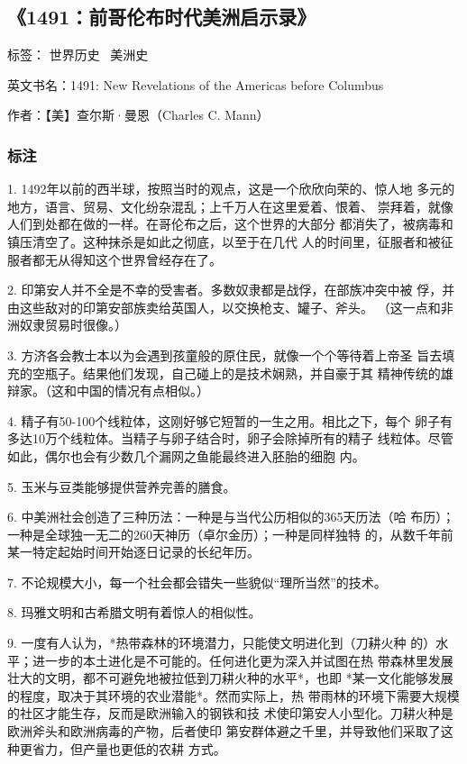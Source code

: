 \subsection{《1491：前哥伦布时代美洲启示录》}

标签： 世界历史 \ 美洲史

英文书名：1491: New Revelations of the Americas before Columbus

作者：【美】查尔斯·曼恩（Charles C. Mann）


\subsubsection{标注}
1. 1492年以前的西半球，按照当时的观点，这是一个欣欣向荣的、惊人地
多元的地方，语言、贸易、文化纷杂混乱；上千万人在这里爱着、恨着、
崇拜着，就像人们到处都在做的一样。在哥伦布之后，这个世界的大部分
都消失了，被病毒和镇压清空了。这种抹杀是如此之彻底，以至于在几代
人的时间里，征服者和被征服者都无从得知这个世界曾经存在了。

2. 印第安人并不全是不幸的受害者。多数奴隶都是战俘，在部族冲突中被
俘，并由这些敌对的印第安部族卖给英国人，以交换枪支、罐子、斧头。
（这一点和非洲奴隶贸易时很像。）

3. 方济各会教士本以为会遇到孩童般的原住民，就像一个个等待着上帝圣
旨去填充的空瓶子。结果他们发现，自己碰上的是技术娴熟，并自豪于其
精神传统的雄辩家。（这和中国的情况有点相似。）

4. 精子有50-100个线粒体，这刚好够它短暂的一生之用。相比之下，每个
卵子有多达10万个线粒体。当精子与卵子结合时，卵子会除掉所有的精子
线粒体。尽管如此，偶尔也会有少数几个漏网之鱼能最终进入胚胎的细胞
内。

5. 玉米与豆类能够提供营养完善的膳食。

6. 中美洲社会创造了三种历法：一种是与当代公历相似的365天历法（哈
布历）；一种是全球独一无二的260天神历（卓尔金历）；一种是同样独特
的，从数千年前某一特定起始时间开始逐日记录的长纪年历。

7. 不论规模大小，每一个社会都会错失一些貌似“理所当然”的技术。

8. 玛雅文明和古希腊文明有着惊人的相似性。

9. 一度有人认为，*热带森林的环境潜力，只能使文明进化到（刀耕火种
的）水平；进一步的本土进化是不可能的。任何进化更为深入并试图在热
带森林里发展壮大的文明，都不可避免地被拉低到刀耕火种的水平*，也即
*某一文化能够发展的程度，取决于其环境的农业潜能*。然而实际上，热
带雨林的环境下需要大规模的社区才能生存，反而是欧洲输入的钢铁和技
术使印第安人小型化。刀耕火种是欧洲斧头和欧洲病毒的产物，后者使印
第安群体避之千里，并导致他们采取了这种更省力，但产量也更低的农耕
方式。

